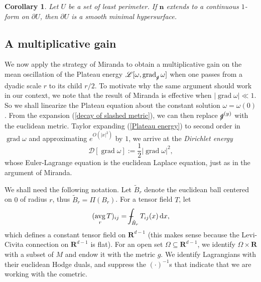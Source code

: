 \documentclass[reqno,12pt,letterpaper]{amsart}
\newcommand{\RR}{\mathbf{R}}
\DeclareMathOperator{\avg}{avg}
\newcommand*\dif{\mathop{}\!\mathrm{d}}
\DeclareMathOperator{\grad}{grad}
\newcommand{\Lagrange}{\mathscr L}
\newcommand{\DirL}{\mathscr D}
\newcommand{\normal}{\mathbf n}
\newcommand{\dfn}[1]{\emph{#1}\index{#1}}
\newtheorem{corollary}[theorem]{Corollary}
\theoremstyle{definition}
\numberwithin{equation}{section}
\def\Xint#1{\mathchoice
{\XXint\displaystyle\textstyle{#1}}%
{\XXint\textstyle\scriptstyle{#1}}%
{\XXint\scriptstyle\scriptscriptstyle{#1}}%
{\XXint\scriptscriptstyle\scriptscriptstyle{#1}}%
\!\int}
\def\XXint#1#2#3{{\setbox0=\hbox{$#1{#2#3}{\int}$ }
\vcenter{\hbox{$#2#3$ }}\kern-.6\wd0}}
\def\dashint{\Xint-}
\begin{document}
\begin{corollary}\label{C1 implies smooth}
Let $U$ be a set of least perimeter. If $\normal$ extends to a continuous $1$-form on $\partial U$, then $\partial U$ is a smooth minimal hypersurface.
\end{corollary}

\subsection{A multiplicative gain}
We now apply the strategy of Miranda \cite[Teorema 4.3]{Miranda66} to obtain a multiplicative gain on the mean oscillation of the Plateau energy $\Lagrange[\omega, \grad_{\slashed g} \omega]$ when one passes from a dyadic scale $r$ to its child $r/2$.
To motivate why the same argument should work in our context, we note that the result of Miranda is effective when $|\grad \omega| \ll 1$.
So we shall linearize the Plateau equation about the constant solution $\omega = \omega(0)$.
From the expansion (\ref{decay of slashed metric}), we can then replace $\slashed g^{(y)}$ with the euclidean metric. Taylor expanding (\ref{Plateau energy}) to second order in $\grad \omega$ and approximating $e^{O(|x|^2)}$ by $1$, we arrive at the \dfn{Dirichlet energy}
$$\DirL[\grad \omega] := \frac{1}{2} |\grad \omega|^2,$$
whose Euler-Lagrange equation is the euclidean Laplace equation, just as in the argument of Miranda.

We shall need the following notation.
Let $\tilde B_r$ denote the euclidean ball centered on $0$ of radius $r$, thus $\tilde B_r = \Pi(B_r)$.
For a tensor field $T$, let
$$(\avg_r T)_{ij} = \dashint_{\tilde B_r} T_{ij}(x) \dif x,$$
which defines a constant tensor field on $\RR^{d - 1}$ (this makes sense because the Levi-Civita connection on $\RR^{d - 1}$ is flat).
For an open set $\Omega \subseteq \RR^{d - 1}$, we identify $\Omega \times \RR$ with a subset of $M$ and endow it with the metric $g$.
We identify Lagrangians with their euclidean Hodge duals, and suppress the $(\cdot)^{-1}$s that indicate that we are working with the cometric.
\end{document}
